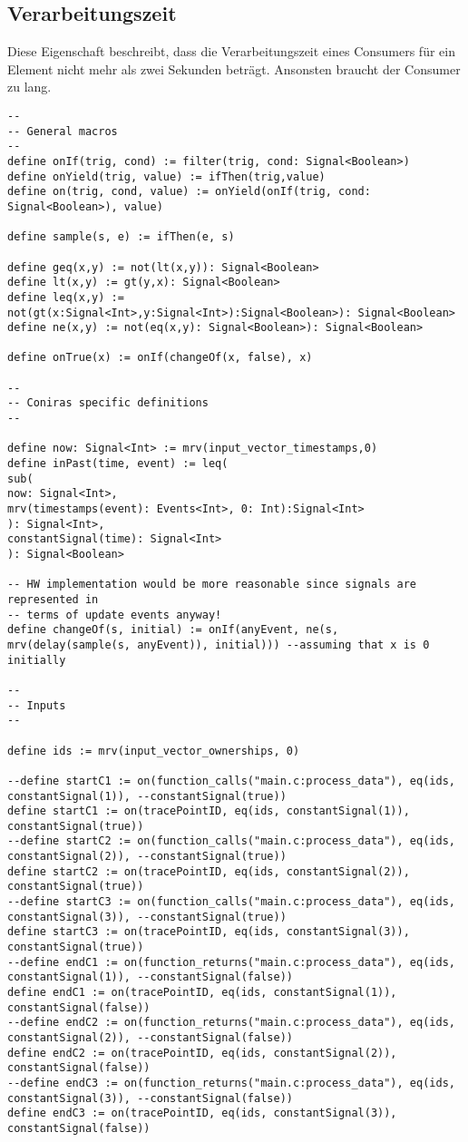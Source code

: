 \documentclass{article}
\begin{document}
\subsection{Verarbeitungszeit}

Diese Eigenschaft beschreibt, dass die Verarbeitungszeit eines Consumers für ein Element nicht mehr als zwei Sekunden beträgt. Ansonsten braucht der Consumer zu lang.

\begin{lstlisting}[language=tessla+salt]
--
-- General macros
--
define onIf(trig, cond) := filter(trig, cond: Signal<Boolean>)
define onYield(trig, value) := ifThen(trig,value)
define on(trig, cond, value) := onYield(onIf(trig, cond: Signal<Boolean>), value)

define sample(s, e) := ifThen(e, s)

define geq(x,y) := not(lt(x,y)): Signal<Boolean>
define lt(x,y) := gt(y,x): Signal<Boolean>
define leq(x,y) := not(gt(x:Signal<Int>,y:Signal<Int>):Signal<Boolean>): Signal<Boolean>
define ne(x,y) := not(eq(x,y): Signal<Boolean>): Signal<Boolean>

define onTrue(x) := onIf(changeOf(x, false), x)

--
-- Coniras specific definitions
--

define now: Signal<Int> := mrv(input_vector_timestamps,0)
define inPast(time, event) := leq(
sub(
now: Signal<Int>,
mrv(timestamps(event): Events<Int>, 0: Int):Signal<Int>
): Signal<Int>,
constantSignal(time): Signal<Int>
): Signal<Boolean>

-- HW implementation would be more reasonable since signals are represented in
-- terms of update events anyway!
define changeOf(s, initial) := onIf(anyEvent, ne(s, mrv(delay(sample(s, anyEvent)), initial))) --assuming that x is 0 initially

--
-- Inputs
--

define ids := mrv(input_vector_ownerships, 0)

--define startC1 := on(function_calls("main.c:process_data"), eq(ids, constantSignal(1)), --constantSignal(true))
define startC1 := on(tracePointID, eq(ids, constantSignal(1)), constantSignal(true))
--define startC2 := on(function_calls("main.c:process_data"), eq(ids, constantSignal(2)), --constantSignal(true))
define startC2 := on(tracePointID, eq(ids, constantSignal(2)), constantSignal(true))
--define startC3 := on(function_calls("main.c:process_data"), eq(ids, constantSignal(3)), --constantSignal(true))
define startC3 := on(tracePointID, eq(ids, constantSignal(3)), constantSignal(true))
--define endC1 := on(function_returns("main.c:process_data"), eq(ids, constantSignal(1)), --constantSignal(false))
define endC1 := on(tracePointID, eq(ids, constantSignal(1)), constantSignal(false))
--define endC2 := on(function_returns("main.c:process_data"), eq(ids, constantSignal(2)), --constantSignal(false))
define endC2 := on(tracePointID, eq(ids, constantSignal(2)), constantSignal(false))
--define endC3 := on(function_returns("main.c:process_data"), eq(ids, constantSignal(3)), --constantSignal(false))
define endC3 := on(tracePointID, eq(ids, constantSignal(3)), constantSignal(false))


\end{lstlisting}
\end{document}
